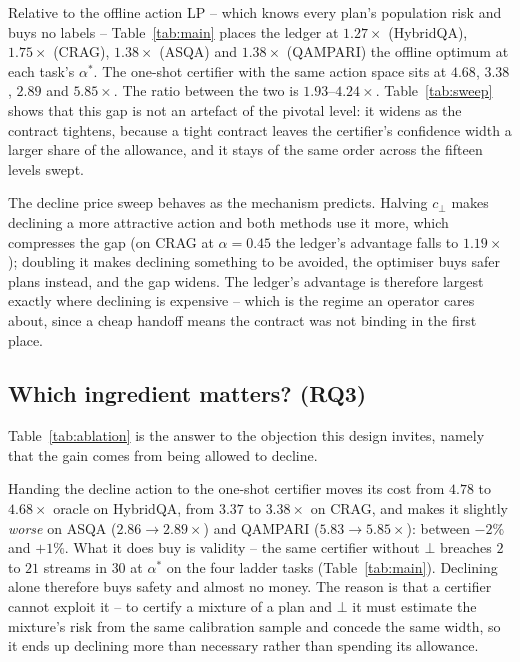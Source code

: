 Relative to the offline action LP -- which knows every plan's population
risk and buys no labels -- Table~\ref{tab:main} places the ledger at
$1.27\times$ (HybridQA), $1.75\times$ (CRAG), $1.38\times$ (ASQA) and
$1.38\times$ (QAMPARI) the offline optimum at each task's $\alpha^{*}$.
The one-shot certifier with the same action space sits at $4.68$,
$3.38$, $2.89$ and $5.85\times$. The ratio between the two is
$1.93$--$4.24\times$. Table~\ref{tab:sweep} shows that this gap is not
an artefact of the pivotal level: it widens as the contract tightens,
because a tight contract leaves the certifier's confidence width a
larger share of the allowance, and it stays of the same order across
the fifteen levels swept.

The decline price sweep behaves as the mechanism predicts. Halving
$c_\bot$ makes declining a more attractive action and both methods use
it more, which compresses the gap (on CRAG at $\alpha=0.45$ the ledger's
advantage falls to $1.19\times$); doubling it makes declining something
to be avoided, the optimiser buys safer plans instead, and the gap
widens. The ledger's advantage is therefore largest exactly where
declining is expensive -- which is the regime an operator cares about,
since a cheap handoff means the contract was not binding in the first
place.

\subsection{Which ingredient matters? (RQ3)}
\label{sec:res:ablation}

Table~\ref{tab:ablation} is the answer to the objection this design
invites, namely that the gain comes from being allowed to decline.

Handing the decline action to the one-shot certifier moves its cost from
$4.78$ to $4.68\times$ oracle on HybridQA, from $3.37$ to $3.38\times$
on CRAG, and makes it slightly \emph{worse} on ASQA ($2.86 \to
2.89\times$) and QAMPARI ($5.83 \to 5.85\times$): between $-2\%$ and
$+1\%$. What it does buy is validity -- the same certifier without
$\bot$ breaches $2$ to $21$ streams in $30$ at $\alpha^{*}$ on the
four ladder tasks (Table~\ref{tab:main}). Declining alone therefore
buys safety and almost no money. The reason is that a certifier cannot
exploit it -- to certify a mixture of a plan and $\bot$ it must estimate
the mixture's risk from the same calibration sample and concede the same
width, so it ends up declining more than necessary rather than spending
its allowance.

